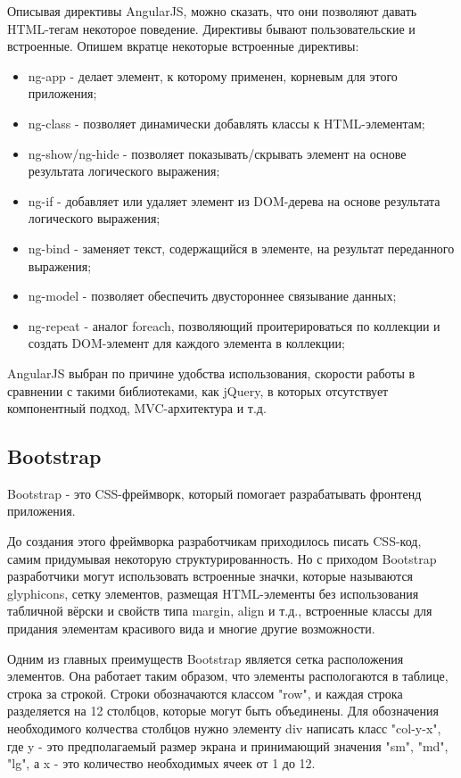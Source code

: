 Описывая директивы AngularJS, можно сказать, что они позволяют давать HTML-тегам некоторое поведение. Директивы бывают пользовательские и встроенные. Опишем вкратце некоторые встроенные директивы:

\begin{itemize}
  \item ng-app - делает элемент, к которому применен, корневым для этого приложения;
  \item ng-class - позволяет динамически добавлять классы к HTML-элементам;
  \item ng-show/ng-hide - позволяет показывать/скрывать элемент на основе результата логического выражения;
  \item ng-if - добавляет или удаляет элемент из DOM-дерева на основе результата логического выражения;
  \item ng-bind - заменяет текст, содержащийся в элементе, на результат переданного выражения;
  \item ng-model - позволяет обеспечить двустороннее связывание данных;
  \item ng-repeat - аналог foreach, позволяющий проитерироваться по коллекции и создать DOM-элемент для каждого элемента в коллекции;
\end{itemize}

AngularJS выбран по причине удобства использования, скорости работы в сравнении с такими библиотеками, как jQuery, в которых отсутствует компонентный подход, MVC-архитектура и т.д.

\subsection{Bootstrap}
\label{sub:technologies:bootstrap}
Bootstrap - это CSS-фреймворк, который помогает разрабатывать фронтенд приложения.

До создания этого фреймворка разработчикам приходилось писать CSS-код, самим придумывая некоторую структурированность. Но с приходом Bootstrap разработчики могут использовать встроенные значки, которые называются glyphicons, сетку элементов, размещая HTML-элементы без использования табличной вёрски и свойств типа margin, align и т.д., встроенные классы для придания элементам красивого вида и многие другие возможности.

Одним из главных преимуществ Bootstrap является сетка расположения элементов. Она работает таким образом, что элементы распологаются в таблице, строка за строкой. Строки обозначаются классом "row", и каждая строка разделяется на 12 столбцов, которые могут быть объединены. Для обозначения необходимого колчества столбцов нужно элементу div написать класс "col-y-x", где y - это предполагаемый размер экрана и принимающий значения "sm", "md", "lg", а x - это количество необходимых ячеек от 1 до 12.
